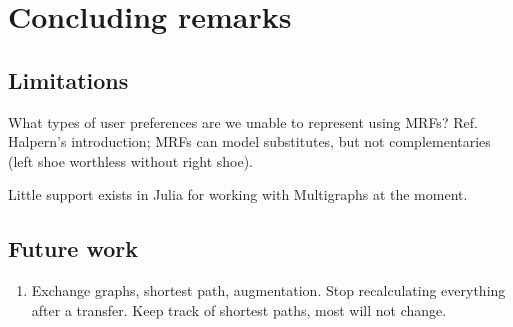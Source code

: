 \chapter{Concluding remarks}
\label{chap:conclusions}
\section{Limitations}
What types of user preferences are we unable to represent using MRFs? Ref. Halpern's introduction; MRFs can model substitutes, but not complementaries (left shoe worthless without right shoe).

Little support exists in Julia for working with Multigraphs at the moment.

\skelpar
\section{Future work}
\begin{enumerate}
  \item Exchange graphs, shortest path, augmentation. Stop recalculating everything after a transfer. Keep track of shortest paths, most will not change.
\end{enumerate}
\skelpar